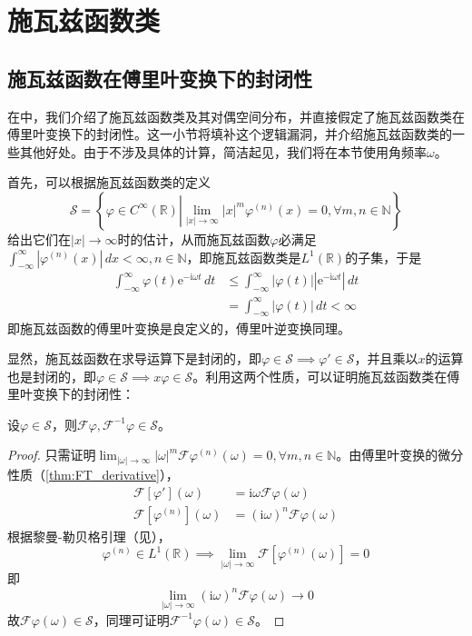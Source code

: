 \section{施瓦兹函数类}\label{sec:Schwartz_Functions}

\subsection{施瓦兹函数在傅里叶变换下的封闭性}\label{sub:fourier_close}
在中，我们介绍了施瓦兹函数类及其对偶空间分布，并直接假定了施瓦兹函数类在傅里叶变换下的封闭性。这一小节将填补这个逻辑漏洞，并介绍施瓦兹函数类的一些其他好处。由于不涉及具体的计算，简洁起见，我们将在本节使用角频率$\omega$。

首先，可以根据施瓦兹函数类的定义\[\mathcal{S} =\left\{\varphi\in C^{\infty}(\mathbb{R} )\left|\lim_{|x|\to\infty}|x|^m\varphi^{(n)}(x)=0,\forall m,n\in\mathbb{N} \right.\right\}\]给出它们在$|x|\to\infty$时的估计，从而施瓦兹函数$\varphi$必满足$\int_{-\infty}^{\infty}|\varphi^{(n)}(x)|\,dx<\infty,n\in\mathbb{N}$，即施瓦兹函数类是$L^1(\mathbb{R} )$的子集，于是\begin{align*}
    \int_{-\infty}^{\infty}\varphi(t)\mathrm{e}^{-\mathrm{i}\omega t}\,dt & \leq \int_{-\infty}^{\infty}|\varphi(t)||\mathrm{e}^{-\mathrm{i}\omega t}|\,dt \\
                                                                          & =\int_{-\infty}^{\infty}|\varphi(t)|\,dt<\infty
\end{align*}
即施瓦兹函数的傅里叶变换是良定义的，傅里叶逆变换同理。

显然，施瓦兹函数在求导运算下是封闭的，即$\varphi\in\mathcal{S}\implies \varphi'\in\mathcal{S}$，并且乘以$x$的运算也是封闭的，即$\varphi\in\mathcal{S}\implies x\varphi\in\mathcal{S}$。利用这两个性质，可以证明施瓦兹函数类在傅里叶变换下的封闭性：
\begin{theorem}[施瓦兹函数类在傅里叶变换下的封闭性]
    \label{thm:schwartz_close}
    设$\varphi\in\mathcal{S}$，则$\mathcal{F} \varphi,\mathcal{F} ^{-1} \varphi\in\mathcal{S}$。
\end{theorem}
\begin{proof}
    只需证明$\lim_{|\omega|\to\infty}|\omega|^m \mathcal{F} \varphi^{(n)}(\omega)=0,\forall m,n\in\mathbb{N}$。由傅里叶变换的微分性质（\cref{thm:FT_derivative}），
    \begin{align*}
        \mathcal{F} [\varphi'](\omega)      & =\mathrm{i}\omega \mathcal{F} \varphi(\omega)     \\
        \mathcal{F} [\varphi^{(n)}](\omega) & =(\mathrm{i}\omega)^n \mathcal{F} \varphi(\omega)
    \end{align*}
    根据黎曼-勒贝格引理（见），\[\varphi^{(n)}\in L^1(\mathbb{R})\implies\lim_{|\omega|\to\infty}\mathcal{F}\left[ \varphi^{(n)}(\omega)\right]=0\]
    即\[\lim_{|\omega|\to\infty}(\mathrm{i}\omega)^n \mathcal{F} \varphi(\omega)\to 0\]
    故$\mathcal{F} \varphi(\omega)\in\mathcal{S} $，同理可证明$\mathcal{F}^{-1} \varphi(\omega)\in\mathcal{S} $。
\end{proof}

